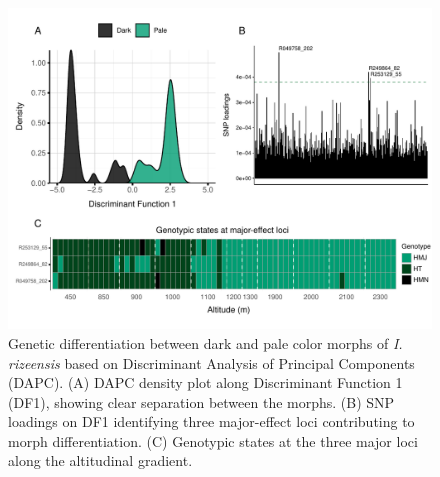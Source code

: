 \documentclass[9pt,a4paper,twoside]{rho-class/rho}
\begin{document}
\begin{figure}[b!]
\centering
\includegraphics[width=1.8\columnwidth]{Figure_5.pdf}
\caption{Genetic differentiation between dark and pale color morphs of \textit{I. rizeensis} based on Discriminant Analysis of Principal Components (DAPC). (A) DAPC density plot along Discriminant Function 1 (DF1), showing clear separation between the morphs. (B) SNP loadings on DF1 identifying three major-effect loci contributing to morph differentiation. (C) Genotypic states at the three major loci along the altitudinal gradient.}
\label{Figure 5}
\end{figure}
\end{document}
